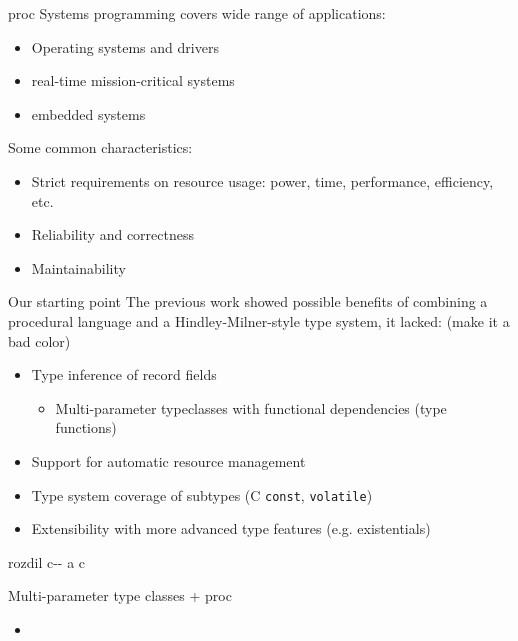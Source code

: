 \documentclass[aspectratio=169]{beamer}
\newcommand{\xxx}[1]{\textcolor{red!}{#1}}
\newcommand{\li}[1]{\lstinline{#1}}
\begin{document}
\begin{frame}{proc}
  Systems programming covers wide range of applications:

  \begin{itemize}
    \item Operating systems and drivers
    \item real-time mission-critical systems
    \item embedded systems
  \end{itemize}

  Some common characteristics:

  \begin{itemize}
    \item Strict requirements on resource usage: power, time, performance, efficiency, etc.
    \item Reliability and correctness
    \item Maintainability
  \end{itemize}
\end{frame}

\begin{frame}{Our starting point}
  The previous work showed possible benefits of combining a procedural language and a Hindley-Milner-style type system, it lacked: (\xxx{make it a bad color})

  \begin{itemize}
    \item Type inference of record fields
    \begin{itemize}
      \item Multi-parameter typeclasses with functional dependencies (type functions)
    \end{itemize}
    \item Support for automatic resource management
    \item Type system coverage of subtypes (C \li{const}, \li{volatile})
    \item Extensibility with more advanced type features (e.g. existentials)
  \end{itemize}
\end{frame}

\begin{frame}{rozdil c-{}- a c}
\end{frame}

\begin{frame}{Multi-parameter type classes + proc}
  \begin{itemize}
    \item 
  \end{itemize}
\end{frame}
\end{document}
